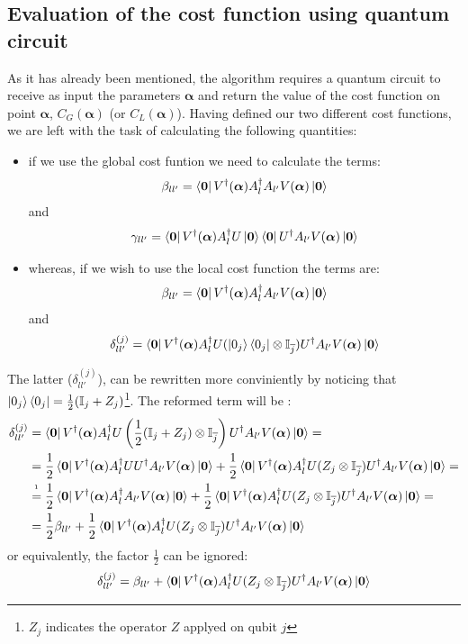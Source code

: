 \documentclass[12pt]{article}
\begin{document}
\subsection*{Evaluation of the cost function using quantum circuit}
As it has already been mentioned, the algorithm requires a quantum circuit to receive as input the parameters $\boldsymbol{\alpha}$ and return the value of the cost function on point $\boldsymbol{\alpha}$, $C_G(\boldsymbol{\alpha})$
(or $C_L(\boldsymbol{\alpha})$). Having defined our two different cost functions, we are left with the task of calculating the following quantities:
\begin{itemize}
    \item if we use the global cost funtion we need to calculate the terms:
    $$\beta_{ll'} =  \left\langle{\bf 0}\right\vert V^\dag({\boldsymbol{\alpha}})A_l^\dag  A_{l'}V({\boldsymbol{\alpha}})\left\vert{\bf 0}\right\rangle$$
    and
    $$\gamma_{ll'} =  \left\langle{\bf 0}\right\vert V^\dag({\boldsymbol{\alpha}})A_l^\dag U\left\vert{\bf 0}\right\rangle\left\langle{\bf 0}\right\vert U^\dag A_{l'}V({\boldsymbol{\alpha}})\left\vert{\bf 0}\right\rangle$$
    \item whereas, if we wish to use the local cost function the terms are:
    $$\beta_{ll'} =  \left\langle{\bf 0}\right\vert V^\dag({\boldsymbol{\alpha}})A_l^\dag  A_{l'}V({\boldsymbol{\alpha}})\left\vert{\bf 0}\right\rangle$$
    and
    $$\delta_{ll'}^{(j)}= \left\langle{\bf 0}\right\vert V^\dag({\boldsymbol{\alpha}})A_l^\dag U(\left\vert{0_j}\right\rangle\left\langle{0_j}\right\vert\otimes \mathbb{I}_{\overline j} )U^\dag A_{l'}V({\boldsymbol{\alpha}})\left\vert{\bf 0}\right\rangle$$
    
\end{itemize}
The latter ($\delta_{ll'}^{(j)}$), can be rewritten more conviniently by noticing that $\left\vert{0_j}\right\rangle\left\langle{0_j}\right\vert = \frac{1}{2}(\mathbb{I}_{j} + Z_j)$\footnote[1]{$Z_j$ indicates the operator $Z$ applyed on qubit $j$}. 
The reformed term will be :
\begin{align*}
    \delta_{ll'}^{(j)}&= \bra{\bf 0}V^\dag({\boldsymbol{\alpha}})A_l^\dag U\left(\frac{1}{2}(\mathbb{I}_{j} + Z_j)\otimes \mathbb{I}_{\overline j} \right)U^\dag A_{l'}V({\boldsymbol{\alpha}})\ket{\bf 0} =\\
    & = \frac{1}{2}\bra{\bf 0}V^\dag({\boldsymbol{\alpha}})A_l^\dag UU^\dag A_{l'}V({\boldsymbol{\alpha}})\ket{\bf 0} + \frac{1}{2}\bra{\bf 0}V^\dag({\boldsymbol{\alpha}})A_l^\dag U(Z_j\otimes \mathbb{I}_{\overline j} )U^\dag A_{l'}V({\boldsymbol{\alpha}})\ket{\bf 0} = \\
    &\stackrel{\textnormal{\footnotemark}}{=}  \frac{1}{2}\bra{\bf 0}V^\dag({\boldsymbol{\alpha}})A_l^\dag  A_{l'}V({\boldsymbol{\alpha}})\ket{\bf 0} + \frac{1}{2}\bra{\bf 0}V^\dag({\boldsymbol{\alpha}})A_l^\dag U(Z_j\otimes \mathbb{I}_{\overline j} )U^\dag A_{l'}V({\boldsymbol{\alpha}})\ket{\bf 0} = \\
    & = \frac{1}{2}\beta_{ll'} + \frac{1}{2}\bra{\bf 0}V^\dag({\boldsymbol{\alpha}})A_l^\dag U(Z_j\otimes \mathbb{I}_{\overline j} )U^\dag A_{l'}V({\boldsymbol{\alpha}})\ket{\bf 0}
\end{align*}
or equivalently, the factor $\frac{1}{2}$ can be ignored:
$$\delta_{ll'}^{(j)} = \beta_{ll'} + \left\langle{\bf 0}\right\vert V^\dag({\boldsymbol{\alpha}})A_l^\dag U(Z_j\otimes \mathbb{I}_{\overline j} )U^\dag A_{l'}V({\boldsymbol{\alpha}})\left\vert{\bf 0}\right\rangle$$
\end{document}
